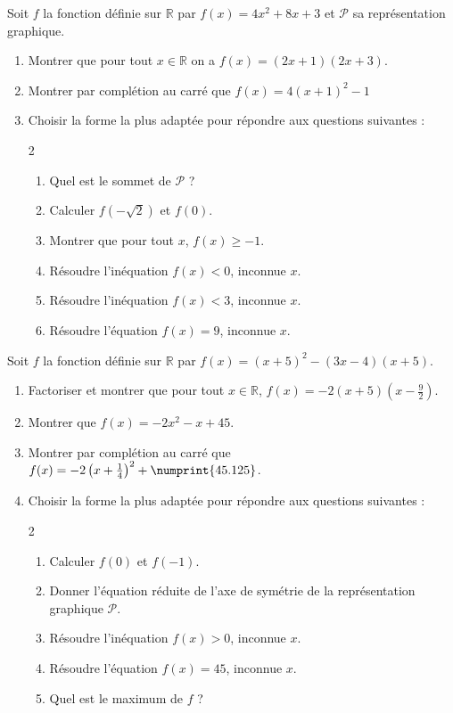 \documentclass[main.tex]{subfiles}
\begin{document}
\begin{exercise} 
	Soit $f$ la fonction définie sur $\mathbb{R}$ par $f(x) =4x^2+8x+3$ et $\mathscr{P}$ sa représentation graphique.
	\begin{enumerate}[leftmargin=*,label=\arabic*)]
		\item Montrer que pour tout $x\in\mathbb{R}$ on a $f(x)=(2x+1)(2x+3)$.
		\item Montrer par complétion au carré que $f(x)=4\left(x+1 \right)^2 -1 $
		\item Choisir la forme la plus adaptée pour répondre aux questions suivantes :
		\vspace{-1em}
		\begin{multicols}{2}
			\begin{enumerate}[leftmargin=*,label=\alph*)]
				\item Quel est le sommet de $\mathscr{P}$ ?
				\item Calculer $f(-\sqrt{2})$ et $f(0)$.
				\item Montrer que pour tout $x$, $f(x)\geqslant -1$.
				\item Résoudre l'inéquation $f(x)<0$, inconnue $x$.
				\item Résoudre l'inéquation $f(x)<3$, inconnue $x$.
				\item Résoudre l'équation $f(x)=9$, inconnue $x$.  
			\end{enumerate} 
		\end{multicols}
	\end{enumerate} 
\end{exercise} 
\begin{exercise} 
	 Soit $f$ la fonction définie sur $\mathbb{R}$ par $f(x) =(x+5)^2-(3x-4)(x+5)$.
	\begin{enumerate}[leftmargin=*,label=\arabic*)] 
		\item Factoriser et montrer que pour tout $x\in\mathbb{R}$, $f(x)=-2(x+5)(x-\tfrac{9}{2})$.
		\item Montrer que $f(x)=-2x^2-x+45$.
		\item Montrer par complétion au carré que $f(x)=-2\left(x+\frac{1}{4} \right)^2 +\numprint{45.125}$. 
		\item Choisir la forme la plus adaptée pour répondre aux questions suivantes : 
		\vspace{-1em}
		\begin{multicols}{2}
			\begin{enumerate}[leftmargin=*,label=\alph*)]
				\item Calculer $f(0)$ et $f(-1)$.
				\item Donner l'équation réduite de l'axe de symétrie de la représentation graphique $\mathscr{P}$. 
				\item Résoudre l'inéquation $f(x)>0$, inconnue $x$.
				\item Résoudre l'équation $f(x)=45$, inconnue $x$.
				\item Quel est le maximum de $f$ ? 
			\end{enumerate} 
		\end{multicols}
	\end{enumerate} 
\end{exercise}
\end{document}
